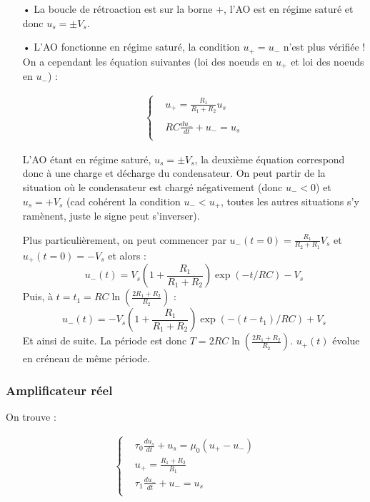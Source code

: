 \documentclass{report}
\begin{document}
\begin{itemize}
	\item[•] La boucle de rétroaction est sur la borne +, l'AO est en régime saturé et donc $u_s=\pm V_s$. 

	\item[•] L'AO fonctionne en régime saturé, la condition $u_+=u_-$ n'est plus vérifiée ! On a cependant les équation suivantes (loi des noeuds en $u_+$ et loi des noeuds en $u_-$) :
	
\begin{align*}
	\left\lbrace
\begin{array}{cc}
	&  u_+=\frac{R_1}{R_1+R_2}u_s\\
	\\
	&RC\frac{du_-}{dt} +u_- =u_s  \\
\end{array}\right.
\end{align*}	

L'AO étant en régime saturé, $u_s=\pm V_s$, la deuxième équation correspond donc à une charge et décharge du condensateur. On peut partir de la situation où le condensateur est chargé négativement (donc $u_-<0$) et $u_s=+V_s$ (cad cohérent la condition $u_-<u_+$, toutes les autres situations s'y ramènent, juste le signe peut s'inverser). 

	Plus particulièrement, on peut commencer par $u_-(t=0)=\frac{R_1}{R_2+R_1}V_s$ et $u_+(t=0)=-V_s$ et alors :
	\begin{equation}
		u_-(t)=V_s\left(1+\frac{R_1}{R_1+R_2}\right)\exp(-t/RC)-V_s 
	\end{equation}
Puis, à $t=t_1=RC\ln\left(\frac{2R_1+R_2}{R_2} \right)$ :
	\begin{equation}
		u_-(t)=-V_s\left(1+\frac{R_1}{R_1+R_2}\right)\exp(-(t-t_1)/RC)+V_s 
	\end{equation}
Et ainsi de suite. La période est donc $T = 2RC\ln\left(\frac{2R_1+R_2}{R_2} \right)$. $u_+(t)$ évolue en créneau de même période. 
\end{itemize}

\subsubsection{Amplificateur réel}

On trouve :

\begin{align*}
	\left\lbrace
\begin{array}{cc}
	& \tau_0\frac{du_s}{dt} +u_s = \mu_0(u_+-u_-) \\
	&  u_+=\frac{R_1+R_2}{R_1}\\
	&\tau_1\frac{du_-}{dt} +u_- =u_s  \\
\end{array}\right.
\end{align*}
\end{document}
